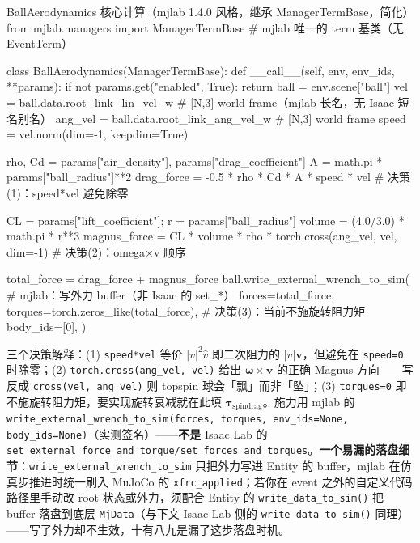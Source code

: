 \begin{codebox}[Python]{BallAerodynamics 核心计算（mjlab 1.4.0 风格，继承 ManagerTermBase，简化）}
from mjlab.managers import ManagerTermBase    # mjlab 唯一的 term 基类（无 EventTerm）

class BallAerodynamics(ManagerTermBase):
    def __call__(self, env, env_ids, **params):
        if not params.get("enabled", True):
            return
        ball = env.scene["ball"]
        vel     = ball.data.root_link_lin_vel_w  # [N,3] world frame（mjlab 长名，无 Isaac 短名别名）
        ang_vel = ball.data.root_link_ang_vel_w  # [N,3] world frame
        speed   = vel.norm(dim=-1, keepdim=True)

        rho, Cd = params["air_density"], params["drag_coefficient"]
        A = math.pi * params["ball_radius"]**2
        drag_force = -0.5 * rho * Cd * A * speed * vel        # 决策(1)：speed*vel 避免除零

        CL = params["lift_coefficient"]; r = params["ball_radius"]
        volume = (4.0/3.0) * math.pi * r**3
        magnus_force = CL * volume * rho * torch.cross(ang_vel, vel, dim=-1)  # 决策(2)：omega×v 顺序

        total_force = drag_force + magnus_force
        ball.write_external_wrench_to_sim(                   # mjlab：写外力 buffer（非 Isaac 的 set_*）
            forces=total_force,
            torques=torch.zeros_like(total_force),           # 决策(3)：当前不施旋转阻力矩
            body_ids=[0],
        )
\end{codebox}

三个决策解释：(1) \verb|speed*vel| 等价 $|v|^2\hat v$ 即二次阻力的 $|v|\mathbf v$，但避免在 \verb|speed=0| 时除零；(2) \verb|torch.cross(ang_vel, vel)| 给出 $\boldsymbol\omega\times\mathbf v$ 的正确 Magnus 方向——写反成 \verb|cross(vel, ang_vel)| 则 topspin 球会「飘」而非「坠」；(3) \verb|torques=0| 即不施旋转阻力矩，要实现旋转衰减就在此填 $\boldsymbol\tau_{\text{spindrag}}$。施力用 mjlab 的 \verb|write_external_wrench_to_sim(forces, torques, env_ids=None, body_ids=None)|（实测签名）——\textbf{不是} Isaac Lab 的 \verb|set_external_force_and_torque/set_forces_and_torques|。\textbf{一个易漏的落盘细节}：\verb|write_external_wrench_to_sim| 只把外力写进 Entity 的 buffer，mjlab 在仿真步推进时统一刷入 MuJoCo 的 \verb|xfrc_applied|；若你在 event 之外的自定义代码路径里手动改 root 状态或外力，须配合 Entity 的 \verb|write_data_to_sim()| 把 buffer 落盘到底层 \verb|MjData|（与下文 Isaac Lab 侧的 \verb|write_data_to_sim()| 同理）——写了外力却不生效，十有八九是漏了这步落盘时机。

